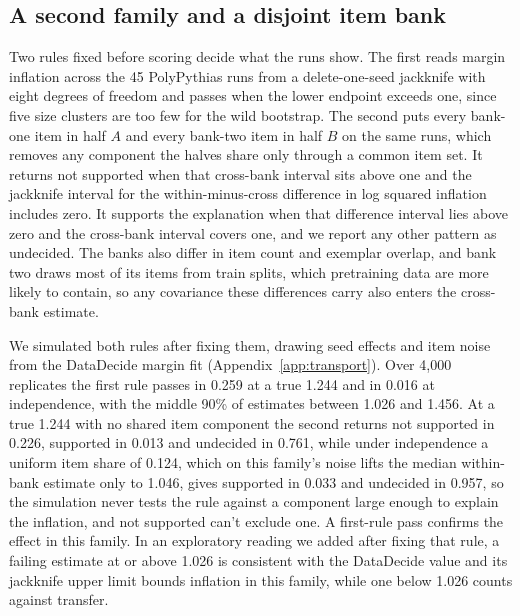 \subsection{A second family and a disjoint item bank}
\label{sec:family}
Two rules fixed before scoring decide what the runs show. The first reads margin inflation across the 45 PolyPythias runs from a delete-one-seed jackknife with eight degrees of freedom and passes when the lower endpoint exceeds one, since five size clusters are too few for the wild bootstrap. The second puts every bank-one item in half $A$ and every bank-two item in half $B$ on the same runs, which removes any component the halves share only through a common item set. It returns not supported when that cross-bank interval sits above one and the jackknife interval for the within-minus-cross difference in log squared inflation includes zero. It supports the explanation when that difference interval lies above zero and the cross-bank interval covers one, and we report any other pattern as undecided. The banks also differ in item count and exemplar overlap, and bank two draws most of its items from train splits, which pretraining data are more likely to contain, so any covariance these differences carry also enters the cross-bank estimate.

We simulated both rules after fixing them, drawing seed effects and item noise from the DataDecide margin fit (Appendix~\ref{app:transport}). Over 4,000 replicates the first rule passes in 0.259 at a true 1.244 and in 0.016 at independence, with the middle 90\% of estimates between 1.026 and 1.456. At a true 1.244 with no shared item component the second returns not supported in 0.226, supported in 0.013 and undecided in 0.761, while under independence a uniform item share of 0.124, which on this family's noise lifts the median within-bank estimate only to 1.046, gives supported in 0.033 and undecided in 0.957, so the simulation never tests the rule against a component large enough to explain the inflation, and not supported can't exclude one. A first-rule pass confirms the effect in this family. In an exploratory reading we added after fixing that rule, a failing estimate at or above 1.026 is consistent with the DataDecide value and its jackknife upper limit bounds inflation in this family, while one below 1.026 counts against transfer.


